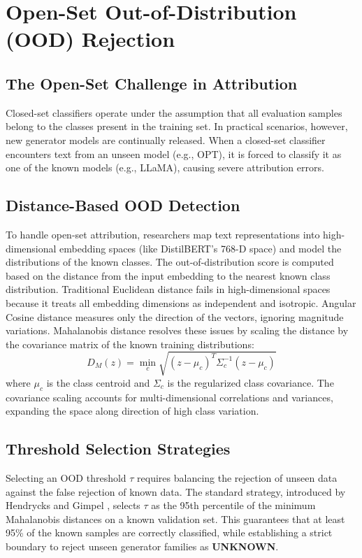 \section{Open-Set Out-of-Distribution (OOD) Rejection}
\subsection{The Open-Set Challenge in Attribution}
Closed-set classifiers operate under the assumption that all evaluation samples belong to the classes present in the training set. In practical scenarios, however, new generator models are continually released. When a closed-set classifier encounters text from an unseen model (e.g., OPT), it is forced to classify it as one of the known models (e.g., LLaMA), causing severe attribution errors.

\subsection{Distance-Based OOD Detection}
To handle open-set attribution, researchers map text representations into high-dimensional embedding spaces (like DistilBERT's 768-D space) and model the distributions of the known classes. The out-of-distribution score is computed based on the distance from the input embedding to the nearest known class distribution.
Traditional Euclidean distance fails in high-dimensional spaces because it treats all embedding dimensions as independent and isotropic. Angular Cosine distance measures only the direction of the vectors, ignoring magnitude variations.
Mahalanobis distance \cite{mahalanobis1936generalized} resolves these issues by scaling the distance by the covariance matrix of the known training distributions:
$$D_M(z) = \min_{c} \sqrt{(z - \mu_c)^T \Sigma_c^{-1} (z - \mu_c)}$$
where $\mu_c$ is the class centroid and $\Sigma_c$ is the regularized class covariance. The covariance scaling accounts for multi-dimensional correlations and variances, expanding the space along direction of high class variation.

\enlargethispage{2\baselineskip}
\subsection{Threshold Selection Strategies}
Selecting an OOD threshold $\tau$ requires balancing the rejection of unseen data against the false rejection of known data. The standard strategy, introduced by Hendrycks and Gimpel \cite{hendrycks2016baseline}, selects $\tau$ as the 95th percentile of the minimum Mahalanobis distances on a known validation set. This guarantees that at least 95\% of the known samples are correctly classified, while establishing a strict boundary to reject unseen generator families as \textbf{UNKNOWN}.

